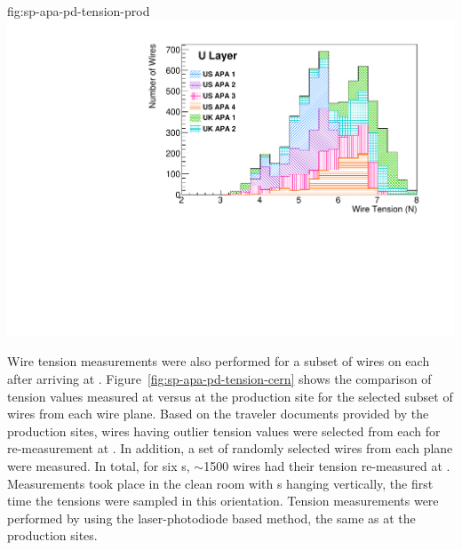\begin{dunefigure}{fig:sp-apa-pd-tension-prod}
\includegraphics[height=0.28\textheight,trim=0mm 0mm 0mm 0mm,clip]{graphics/sp-apa-U-layer-tensions.pdf}
\end{dunefigure}

Wire tension measurements were also performed for a subset of wires on each  after arriving at . Figure~\ref{fig:sp-apa-pd-tension-cern} shows the comparison of tension values measured at  versus at the production site for the selected subset of wires from each wire plane. Based on the traveler documents provided by the production sites, wires having outlier tension values were selected from each  for re-measurement at . In addition, a set of randomly selected wires from each plane were measured. In total, for six s, $\sim$1500 wires had their tension re-measured at . Measurements took place in the clean room with s hanging vertically, the first time the tensions were sampled in this orientation. Tension measurements were performed by using the laser-photodiode based method, the same as at the production sites. %


